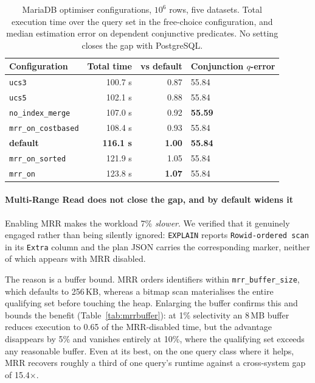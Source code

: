 \documentclass[preprint,12pt,authoryear]{elsarticle}
\begin{document}
\begin{table}[htbp]
\centering
\caption{MariaDB optimiser configurations, $10^6$ rows, five datasets.
Total execution time over the query set in the free-choice
configuration, and median estimation error on dependent conjunctive
predicates. No setting closes the gap with PostgreSQL.}
\label{tab:mysqlsweep}
\small
\begin{tabular}{@{}lrrl@{}}
\toprule
Configuration & Total time & vs default & Conjunction $q$-error \\
\midrule
\texttt{ucs3} & 100.7 s & 0.87 & 55.84 \\
\texttt{ucs5} & 102.1 s & 0.88 & 55.84 \\
\texttt{no\_index\_merge} & 107.0 s & 0.92 & \textbf{55.59} \\
\texttt{mrr\_on\_costbased} & 108.4 s & 0.93 & 55.84 \\
\textbf{default} & \textbf{116.1 s} & \textbf{1.00} & \textbf{55.84} \\
\texttt{mrr\_on\_sorted} & 121.9 s & 1.05 & 55.84 \\
\texttt{mrr\_on} & 123.8 s & \textbf{1.07} & 55.84 \\
\bottomrule
\end{tabular}
\end{table}

\paragraph{Multi-Range Read does not close the gap, and by default widens it}
Enabling MRR makes the workload 7\% \emph{slower}. We verified that it
genuinely engaged rather than being silently ignored: \texttt{EXPLAIN}
reports \texttt{Rowid-ordered scan} in its \texttt{Extra} column and the
plan JSON carries the corresponding marker, neither of which appears
with MRR disabled.

The reason is a buffer bound. MRR orders identifiers within
\texttt{mrr\_buffer\_size}, which defaults to 256\,KB, whereas a bitmap
scan materialises the entire qualifying set before touching the heap.
Enlarging the buffer confirms this and bounds the benefit
(Table~\ref{tab:mrrbuffer}): at 1\% selectivity an 8\,MB buffer reduces
execution to 0.65 of the MRR-disabled time, but the advantage
disappears by 5\% and vanishes entirely at 10\%, where the qualifying
set exceeds any reasonable buffer. Even at its best, on the one query
class where it helps, MRR recovers roughly a third of one query's
runtime against a cross-system gap of 15.4$\times$.
\end{document}
